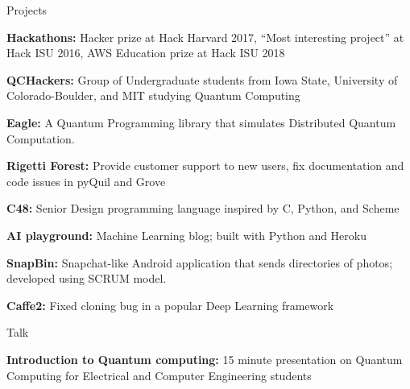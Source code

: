 \documentclass{resume} %
\begin{document}

\begin{rSection}{Projects}


{\bf Hackathons:} Hacker prize at Hack Harvard 2017, “Most interesting project” at Hack ISU 2016, AWS Education prize at Hack ISU 2018

{\bf QCHackers:}
Group of Undergraduate students from Iowa State, University of Colorado-Boulder, and MIT studying Quantum Computing

{\bf Eagle:}
A Quantum Programming library that simulates Distributed Quantum Computation.

{\bf Rigetti Forest:}
Provide customer support to new users, fix documentation and code issues in pyQuil and Grove

{\bf C48:}
Senior Design programming language inspired by C, Python, and Scheme

{\bf AI playground:}
Machine Learning blog; built with Python and Heroku

{\bf SnapBin:}
Snapchat-like Android application that sends directories of photos; developed using SCRUM model.

{\bf Caffe2:}
Fixed cloning bug in a popular Deep Learning framework

\end{rSection}

\begin{rSection}{Talk}

{\bf Introduction to Quantum computing:}
15 minute presentation on Quantum Computing for Electrical and Computer Engineering students

\end{rSection}



\end{document}
